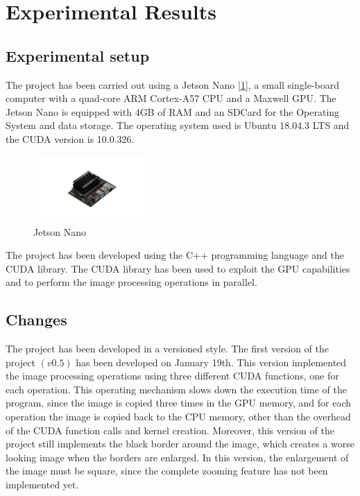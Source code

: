 \section{Experimental Results}

    \subsection{Experimental setup}
    The project has been carried out using a Jetson Nano [\ref{fig:jetson}], a small single-board computer with a quad-core ARM Cortex-A57 CPU and a Maxwell GPU. 
    The Jetson Nano is equipped with 4GB of RAM and an SDCard for the Operating System and data storage. The operating system used is Ubuntu 18.04.3 LTS and the CUDA version is 10.0.326. 

    \begin{figure}[h]
        \centering
        \includegraphics[width=0.4\textwidth]{img/jetson-nano.png}
        \caption{Jetson Nano}
        \label{fig:jetson}
    \end{figure}

    \noindent The project has been developed using the C++ programming language and the CUDA library. 
    The CUDA library has been used to exploit the GPU capabilities and to perform the image processing operations in parallel.

    \subsection{Changes} %
    The project has been developed in a versioned style. The first version of the project $(v0.5)$ has been developed on January 19th. 
    This version implemented the image processing operations using three different CUDA functions, one for each operation. 
    This operating mechanism slows down the execution time of the program, since the image is copied three times in the GPU memory, and 
    for each operation the image is copied back to the CPU memory, other than the overhead of the CUDA function calls and kernel creation.
    Moreover, this version of the project still implements the black border around the image, which creates a worse looking image when the borders are enlarged.
    In this version, the enlargement of the image must be square, since the complete zooming feature has not been implemented yet.

